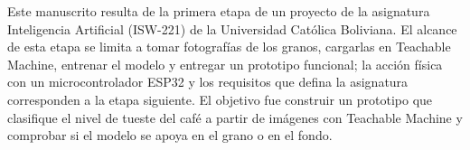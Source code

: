Este manuscrito resulta de la primera etapa de un proyecto de la asignatura Inteligencia Artificial (ISW-221) de la Universidad Católica Boliviana. El alcance de esta etapa se limita a tomar fotografías de los granos, cargarlas en Teachable Machine, entrenar el modelo y entregar un prototipo funcional; la acción física con un microcontrolador ESP32 y los requisitos que defina la asignatura corresponden a la etapa siguiente. El objetivo fue construir un prototipo que clasifique el nivel de tueste del café a partir de imágenes con Teachable Machine y comprobar si el modelo se apoya en el grano o en el fondo.

